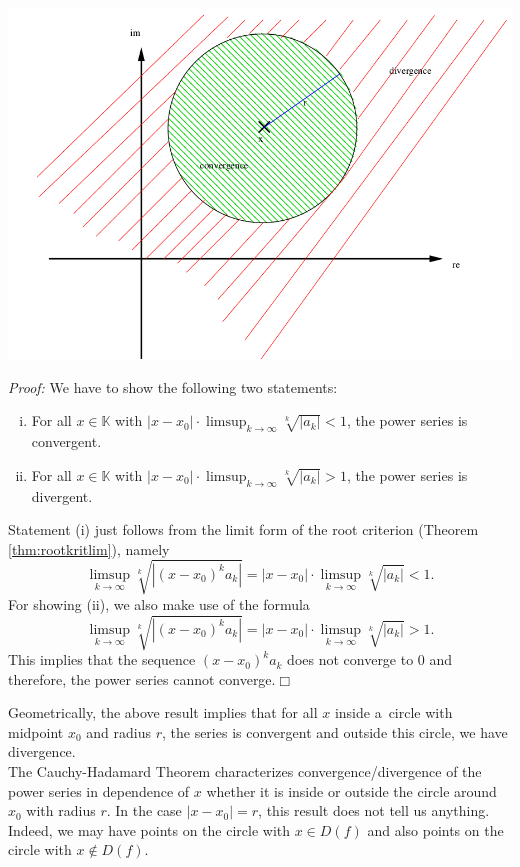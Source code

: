 \includegraphics{./power.png}

{\em Proof:} We have to show the following two statements:
\begin{enumerate}[(i)]
\item For all $x\in\mathbb{K}$ with $|x-x_0|\cdot \limsup_{k\rightarrow\infty} \sqrt[k]{|a_k|}<1$, the power series is convergent.
\item For all $x\in\mathbb{K}$ with $|x-x_0|\cdot \limsup_{k\rightarrow\infty} \sqrt[k]{|a_k|}>1$, the power series is divergent.
\end{enumerate}
Statement (i) just follows from the limit form of the root criterion (Theorem \ref{thm:rootkritlim}), namely
\[\limsup_{k \rightarrow \infty} \sqrt[k]{|(x-x_0)^ka_k|}=|x-x_0|\cdot\limsup_{k \rightarrow \infty} \sqrt[k]{|a_k|}<1.\]
\whiteskip
For showing (ii), we also make use of the formula
\[\limsup_{k \rightarrow \infty} \sqrt[k]{|(x-x_0)^ka_k|}=|x-x_0|\cdot\limsup_{k \rightarrow \infty} \sqrt[k]{|a_k|}>1.\]
This implies that the sequence $(x-x_0)^ka_k$ does not converge to 0 and therefore, the power series cannot converge.\hfill$\Box$

Geometrically, the above result implies that for all $x$ inside a~circle with midpoint $x_0$ and radius $r$, 
the series is convergent and outside this circle, we have divergence.\\
The Cauchy-Hadamard Theorem characterizes convergence/divergence of the power series in dependence of $x$ whether it is inside 
or outside the circle around $x_0$ with radius $r$. In the case $|x-x_0|=r$, this result does not tell us anything. Indeed,
we may have points on the circle with $x\in D(f)$ and also points on the circle with $x\notin D(f)$. 

